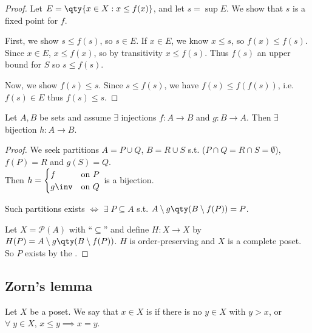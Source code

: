 \begin{proof}
    Let $E = \qty{x \in X : x \leq f(x)}$, and let $s = \sup E$.
    We show that $s$ is a fixed point for $f$.

    First, we show $s \leq f(s)$, so $s \in E$.
    If $x \in E$, we know $x \leq s$, so $f(x) \leq f(s)$.
    Since $x \in E$, $x \leq f(x)$, so by transitivity $x \leq f(s)$.
    Thus $f(s)$ an upper bound for $S$ so $s \leq f(s)$.

    Now, we show $f(s) \leq s$.
    Since $s \leq f(s)$, we have $f(s) \leq f(f(s))$, i.e. $f(s) \in E$ thus $f(s) \leq s$.
\end{proof}

\begin{corollary}
    Let $A, B$ be sets and assume $\exists$ injections $f \colon A \to B$ and $g \colon B \to A$.
    Then $\exists$ bijection $h : A \to B$.
\end{corollary}

\begin{proof}
    We seek partitions $A = P \cup Q$, $B = R \cup S$ s.t. ($P \cap Q = R \cap S = \emptyset$), $f(P) = R$ and $g(S) = Q$. \\
    Then $h = \begin{cases}
        f & \text{on } P \\
        g\inv & \text{on } Q
    \end{cases}$ is a bijection.

    Such partitions exists $\iff$ $\exists \; P \subseteq A$ s.t. $A \setminus g\qty(B \setminus f(P)) = P$.

    Let $X = \mathcal{P}(A)$ with ``$\subseteq$'' and define $H : X \to X$ by $H(P) = A \setminus g\qty(B \setminus f(P))$.
    $H$ is order-preserving and $X$ is a complete poset.
    So $P$ exists by the .
\end{proof}

\subsection{Zorn's lemma}
\begin{definition}[Maximal]
    Let $X$ be a poset.
    We say that $x \in X$ is  if there is no $y \in X$ with $y > x$, or $\forall \; y \in X$, $x \leq y \implies x = y$.
\end{definition}

